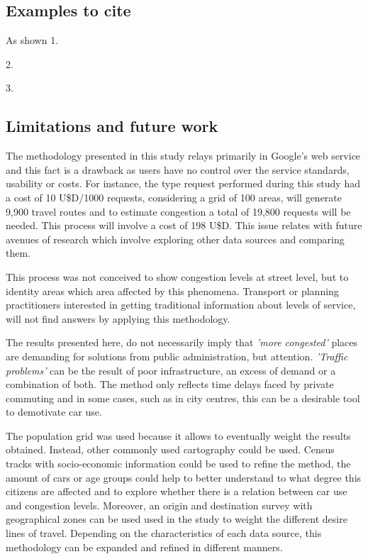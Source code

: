 \documentclass[a4paper]{jpconf}
\begin{document}
\subsection{Examples to cite} %
\indent As shown
 1.\cite{Lomax1997} \par
 2.\parencite{Lomax1997} \par 
 3.\textcite{Lomax1997} \par


\subsection{Limitations and future work}
\indent The methodology presented in this study relays primarily in Google's web service and this fact is a drawback as users have no control over the service standards, usability or costs. For instance, the type request performed during this study had a cost of 10 U\$D/1000 requests, considering a grid of 100 areas, will generate 9,900 travel routes and to estimate congestion a total of 19,800 requests will be needed. This process will involve a cost of 198 U\$D. This issue relates with future avenues of research which involve  exploring other data sources and comparing them.\par

\indent This process was not conceived to show congestion levels at street level, but to identity areas which area affected by this phenomena. Transport or planning practitioners interested in getting traditional information about levels of service, will not find answers by applying this methodology. \par 

\indent The results presented here, do not necessarily imply that \textit{'more congested'} places are demanding for solutions from public administration, but attention. \textit{'Traffic problems'} can be the result of poor infrastructure, an excess of demand or a combination of both. The method only reflects time delays faced by private commuting and in some cases, such as in city centres, this can be a desirable tool to demotivate car use.\par

\indent The population grid was used because it allows to eventually weight the results obtained. Instead, other commonly used cartography could be used. Census tracks with socio-economic information could be used to refine the method, the amount of cars or age groups could help to better understand to what degree this citizens are affected and to explore whether there is a relation between car use and congestion levels. Moreover, an origin and destination survey with geographical zones can be used used in the study to weight the different desire lines of travel. Depending on the characteristics of each data source, this methodology can be expanded and refined in different manners.
\end{document}
